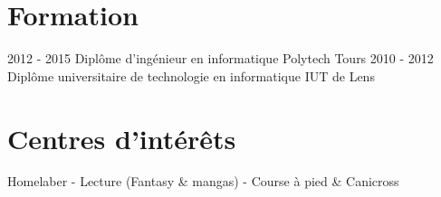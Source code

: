 \documentclass[]{friggeri-cv}
\begin{document}
\vspace{6pt}

\section{Formation}
\vspace{-5pt}
\begin{entrylist}
  \vspace{-8pt}
  \entry
    {2012 - 2015}
    {Diplôme d'ingénieur en informatique}
    {Polytech Tours}
    {}
  \entry
    {2010 - 2012}
    {Diplôme universitaire de technologie en informatique}
    {IUT de Lens}
    {}
\end{entrylist}

\section{Centres d'intérêts}
\vspace{-5pt}
\begin{entrylist}
  \entry
    {Homelaber - Lecture (Fantasy \& mangas) - Course à pied \& Canicross}
    {}    {}    {}
\end{entrylist}
\end{document}
